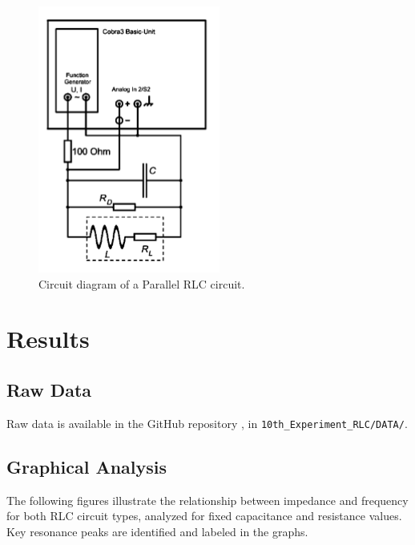 \documentclass[journal]{IEEEtran}
\begin{document}
\begin{figure}[H]
    \centering
    \includegraphics[width=0.5\linewidth]{IMAGES/parallel_diagram.png}
    \caption{Circuit diagram of a Parallel RLC circuit.}
    \label{fig:parallel_circuit}
\end{figure}

\section{Results}

\subsection{Raw Data}
Raw data is available in the GitHub repository \cite{github}, in \verb|10th_Experiment_RLC/DATA/|.


\subsection{Graphical Analysis}
The following figures illustrate the relationship between impedance and frequency for both RLC circuit types, analyzed for fixed capacitance and resistance values. Key resonance peaks are identified and labeled in the graphs.
\end{document}
